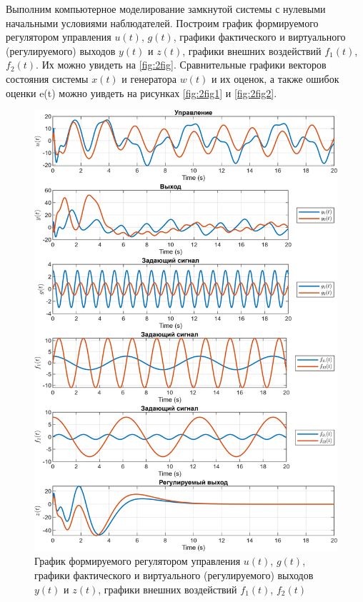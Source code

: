 Выполним компьютерное моделирование замкнутой системы с нулевыми 
начальными условиями наблюдателей. Построим график формируемого регулятором
управления $u(t)$, $g(t)$, графики фактического и виртуального (регулируемого)
выходов $y(t)$ и $z(t)$, графики внешних воздействий $f_1(t)$, $f_2(t)$. 
Их можно увидеть на \autoref{fig:2fig}. 
Сравнительные графики векторов состояния системы $x(t)$ и генератора $w(t)$
и их оценок, а также ошибок оценки e(t) можно уивдеть на 
рисунках \ref{fig:2fig1} и \ref{fig:2fig2}.
\begin{figure}[H]
    \centering
    \includegraphics[width=\linewidth]{figs/2fig.png}
    \caption{График формируемого регулятором
    управления $u(t)$, $g(t)$, графики фактического и виртуального (регулируемого)
    выходов $y(t)$ и $z(t)$, графики внешних воздействий $f_1(t)$, $f_2(t)$}
    \label{fig:2fig}
\end{figure}
